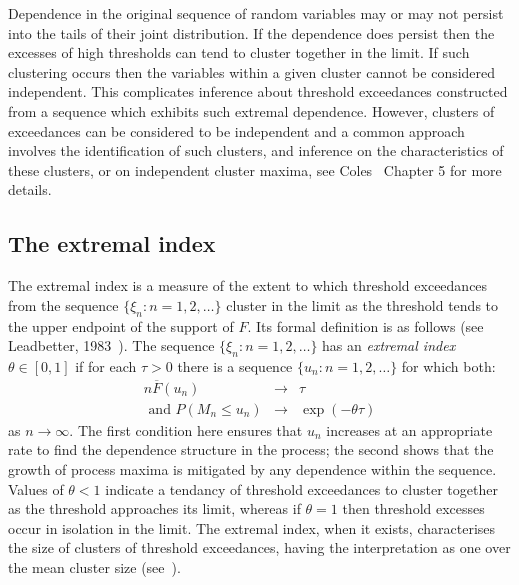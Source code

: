 \documentclass[10pt]{article}\usepackage[]{graphicx}\usepackage[]{color}
\begin{document}
Dependence in the original sequence of random variables may or may not persist into the tails of their joint distribution. If the dependence does persist then the excesses of high thresholds can tend to cluster together in the limit. If such clustering occurs then the variables within a given cluster cannot be considered independent.  This complicates inference about threshold exceedances constructed from a sequence which exhibits such extremal dependence.  However, clusters of exceedances can be considered to be independent and a common approach involves the identification of such clusters, and inference on the characteristics of these clusters, or on independent cluster maxima, see Coles~\cite{coles} Chapter 5 for more details.
%
\subsection{The extremal index}
%
The extremal index is a measure of the extent to which threshold exceedances from the sequence $\{\xi_n:n=1,2,\ldots\}$ cluster in the limit as the threshold tends to the upper endpoint of the support of $F$.  Its formal definition is as follows (see Leadbetter, 1983~\cite{Leadbetter1983}). The sequence $\{\xi_n: n=1,2,\ldots \}$ has an \emph{extremal index} $\theta\in[0,1]$ if for each $\tau>0$ there is a sequence $\{u_n:n=1,2,\ldots\}$ for which both:
\begin{eqnarray*}
  n \overline F(u_n) &\rightarrow& \tau\\
  \mbox{ and } P(M_n\leq u_n) &\rightarrow& \exp(-\theta \tau)
\end{eqnarray*}
as $n\rightarrow\infty$. The first condition here ensures that $u_n$ increases at an appropriate rate to find the dependence structure in the process; the second shows that the growth of process maxima is mitigated by any dependence within the sequence. Values of $\theta<1$ indicate a tendancy of threshold exceedances to cluster together as the threshold approaches its limit, whereas if $\theta=1$ then threshold excesses occur in isolation in the limit.  The extremal index, when it exists, characterises the size of clusters of threshold exceedances, having the interpretation as one over the mean cluster size (see~\cite{Leadbetter1983}).
%
\end{document}
